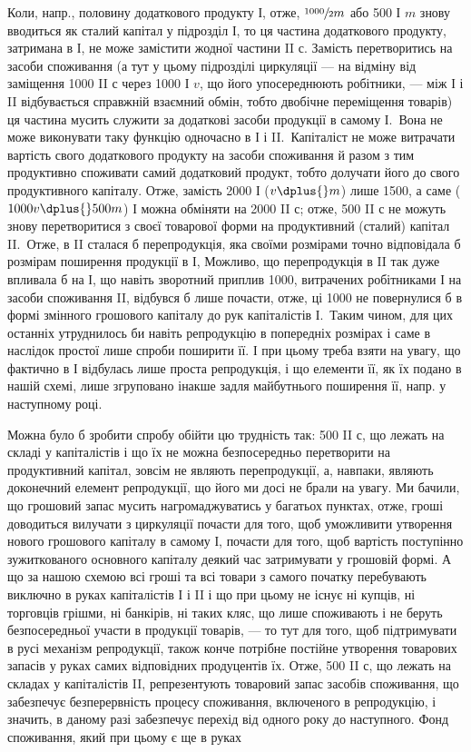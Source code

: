 

\noindent{}Коли, напр., половину додаткового продукту І, отже, $\sfrac{1000}{2} m$ або
500 І $m$ знову вводиться як сталий капітал у підрозділ І, то ця частина
додаткового продукту, затримана в І, не може замістити жодної частини
II $с$. Замість перетворитись на засоби споживання (а тут у цьому підрозділі
циркуляції — на відміну від заміщення 1000 II $с$ через 1000 І $v$,
що його упосереднюють робітники, — між І і II відбувається справжній
взаємний обмін, тобто двобічне переміщення товарів) ця частина мусить
служити за додаткові засоби продукції в самому І.~Вона не може виконувати
таку функцію одночасно в І і II.~Капіталіст не може витрачати
вартість свого додаткового продукту на засоби споживання й разом
з тим продуктивно споживати самий додатковий продукт, тобто долучати
його до свого продуктивного капіталу. Отже, замість 2000 І ($v \dplus{} m$)
лише 1500, а саме ($1000 v \dplus{} 500 m$) І можна обміняти на 2000 II $с$;
отже, 500 II $с$ не можуть знову перетворитися з своєї товарової форми
на продуктивний (сталий) капітал II.~Отже, в II сталася б перепродукція,
яка своїми розмірами точно відповідала б розмірам поширення продукції
в І, Можливо, що перепродукція в II так дуже впливала б на І,
що навіть зворотний приплив 1000, витрачених робітниками І на засоби
споживання II, відбувся б лише почасти, отже, ці 1000 не повернулися б
в формі змінного грошового капіталу до рук капіталістів І.~Таким чином,
для цих останніх утруднилось би навіть репродукцію в попередніх
розмірах і саме в наслідок простої лише спроби поширити її. І при цьому
треба взяти на увагу, що фактично в І відбулась лише проста репродукція,
і що елементи її, як їх подано в нашій схемі, лише згруповано інакше
задля майбутнього поширення її, напр. у наступному році.

Можна було б зробити спробу обійти цю трудність так: 500 II $с$,
що лежать на складі у капіталістів і що їх не можна безпосередньо
перетворити на продуктивний капітал, зовсім не являють перепродукції,
а, навпаки, являють доконечний елемент репродукції, що його ми досі
не брали на увагу. Ми бачили, що грошовий запас мусить нагромаджуватись
у багатьох пунктах, отже, гроші доводиться вилучати з циркуляції
почасти для того, щоб уможливити утворення нового грошового
капіталу в самому І, почасти для того, щоб вартість поступінно
зужиткованого основного капіталу деякий час затримувати у грошовій
формі. А що за нашою схемою всі гроші та всі товари з самого
початку перебувають виключно в руках капіталістів І і II і що
при цьому не існує ні купців, ні торговців грішми, ні банкірів, ні таких
кляс, що лише споживають і не беруть безпосередньої участи в продукції
товарів, — то тут для того, щоб підтримувати в русі механізм репродукції,
також конче потрібне постійне утворення товарових запасів
у руках самих відповідних продуцентів їх. Отже, 500 II $с$, що лежать
на складах у капіталістів II, репрезентують товаровий запас засобів споживання,
що забезпечує безперервність процесу споживання, включеного
в репродукцію, і значить, в даному разі забезпечує перехід від одного
року до наступного. Фонд споживання, який при цьому є ще в руках
\parbreak{}  %
